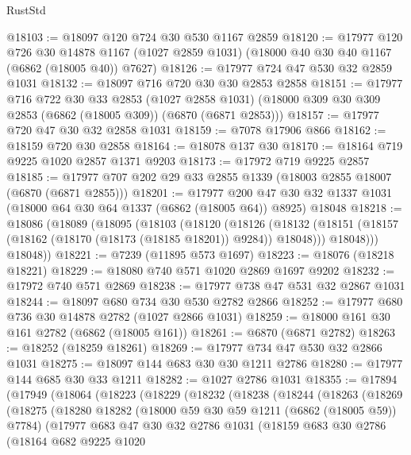 \begin{lexlean}{RustStd}
\begin{coremodule}
@18103 := @18097 @120 @724 @30 @530 @1167 @2859
@18120 := @17977
    @120
    @726
    @30
    @14878
    @1167
    (@1027 @2859 @1031)
    (@18000 @40 @30 @40 @1167 (@6862 (@18005 @40)) @7627)
@18126 := @17977 @724 @47 @530 @32 @2859 @1031
@18132 := @18097 @716 @720 @30 @30 @2853 @2858
@18151 := @17977
    @716
    @722
    @30
    @33
    @2853
    (@1027 @2858 @1031)
    (@18000 @309 @30 @309 @2853 (@6862 (@18005 @309)) (@6870 (@6871 @2853)))
@18157 := @17977 @720 @47 @30 @32 @2858 @1031
@18159 := @7078 @17906 @866
@18162 := @18159 @720 @30 @2858
@18164 := @18078 @137 @30
@18170 := @18164 @719 @9225 @1020 @2857 @1371 @9203
@18173 := @17972 @719 @9225 @2857
@18185 := @17977 @707 @202 @29 @33 @2855 @1339 (@18003 @2855 @18007 (@6870 (@6871 @2855)))
@18201 := @17977
    @200
    @47
    @30
    @32
    @1337
    @1031
    (@18000 @64 @30 @64 @1337 (@6862 (@18005 @64)) @8925)
    @18048
@18218 := @18086
    (@18089
      (@18095
        (@18103
          (@18120
            (@18126
              (@18132 (@18151 (@18157 (@18162 (@18170 (@18173 (@18185 @18201)) @9284)) @18048)))
              @18048)))
        @18048))
@18221 := @7239 (@11895 @573 @1697)
@18223 := @18076 (@18218 @18221)
@18229 := @18080 @740 @571 @1020 @2869 @1697 @9202
@18232 := @17972 @740 @571 @2869
@18238 := @17977 @738 @47 @531 @32 @2867 @1031
@18244 := @18097 @680 @734 @30 @530 @2782 @2866
@18252 := @17977 @680 @736 @30 @14878 @2782 (@1027 @2866 @1031)
@18259 := @18000 @161 @30 @161 @2782 (@6862 (@18005 @161))
@18261 := @6870 (@6871 @2782)
@18263 := @18252 (@18259 @18261)
@18269 := @17977 @734 @47 @530 @32 @2866 @1031
@18275 := @18097 @144 @683 @30 @30 @1211 @2786
@18280 := @17977 @144 @685 @30 @33 @1211
@18282 := @1027 @2786 @1031
@18355 := @17894
    (@17949
      (@18064
        (@18223
          (@18229
            (@18232
              (@18238
                (@18244
                  (@18263
                    (@18269
                      (@18275
                        (@18280
                          @18282
                          (@18000 @59 @30 @59 @1211 (@6862 (@18005 @59)) @7784)
                          (@17977
                            @683
                            @47
                            @30
                            @32
                            @2786
                            @1031
                            (@18159
                              @683
                              @30
                              @2786
                              (@18164
                                @682
                                @9225
                                @1020

\end{coremodule}
\end{lexlean}
